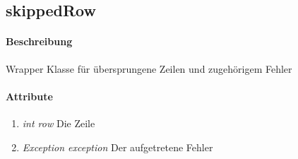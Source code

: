 \subsection{skippedRow}

\paragraph{Beschreibung}
Wrapper Klasse für übersprungene Zeilen und zugehörigem Fehler


\paragraph{Attribute}

\begin{enumerate}[$\bullet$]
	\item \textit{int row} Die Zeile
	\item \textit{Exception exception} Der aufgetretene Fehler
\end{enumerate}

